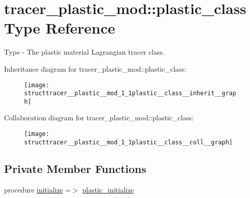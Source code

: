 \hypertarget{structtracer__plastic__mod_1_1plastic__class}{}\section{tracer\+\_\+plastic\+\_\+mod\+:\+:plastic\+\_\+class Type Reference}
\label{structtracer__plastic__mod_1_1plastic__class}


Type -\/ The plastic material Lagrangian tracer class.  




Inheritance diagram for tracer\+\_\+plastic\+\_\+mod\+:\+:plastic\+\_\+class\+:\nopagebreak
\begin{figure}[H]
\begin{center}
\leavevmode
\texttt{[image: structtracer\_\_plastic\_\_mod\_1\_1plastic\_\_class\_\_inherit\_\_graph]}
\end{center}
\end{figure}


Collaboration diagram for tracer\+\_\+plastic\+\_\+mod\+:\+:plastic\+\_\+class\+:\nopagebreak
\begin{figure}[H]
\begin{center}
\leavevmode
\texttt{[image: structtracer\_\_plastic\_\_mod\_1\_1plastic\_\_class\_\_coll\_\_graph]}
\end{center}
\end{figure}
\subsection*{Private Member Functions}
\begin{DoxyCompactItemize}
\item 
procedure \mbox{\hyperlink{structtracer__plastic__mod_1_1plastic__class_af0274af24d9d0dab89751456a0ef83bb}{initialize}} =$>$ \mbox{\hyperlink{namespacetracer__plastic__mod_a42882cd86cfe30f341d8150582a664a9}{plastic\+\_\+initialize}}
\end{DoxyCompactItemize}
